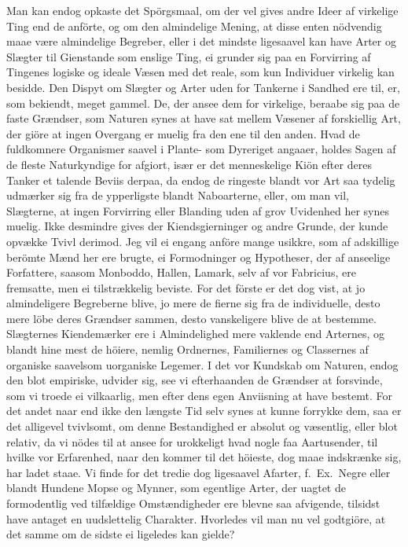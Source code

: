 \documentclass[12pt,a4paper]{article}
\newcommand{\opage}[1]{\marginnote{\footnotesize\textit{[#1]}}}
\begin{document}
Man kan endog opkaste det Spörgsmaal, om der vel gives andre Ideer af
virkelige Ting end de anförte, og om den almindelige Mening, at disse
enten nödvendig maae være almindelige Begreber, eller i det mindste
ligesaavel kan have Arter
\opage{236} og Slægter til Gienstande som enslige Ting, ei grunder sig paa en
Forvirring af Tingenes logiske og ideale Væsen med det reale, som kun
Individuer virkelig kan besidde. Den Dispyt om Slægter og Arter uden for
Tankerne i Sandhed ere til, er, som bekiendt, meget gammel. De, der ansee
dem for virkelige, beraabe sig paa de faste Grændser, som Naturen synes at
have sat mellem Væsener af forskiellig Art, der giöre at ingen Overgang er
muelig fra den ene til den anden. Hvad de fuldkomnere Organismer saavel i
Plante- som Dyreriget angaaer, holdes Sagen af de fleste Naturkyndige for
afgiort, især er det menneskelige Kiön efter deres Tanker et talende Beviis
derpaa, da endog de ringeste blandt vor Art saa tydelig udmærker sig fra de
ypperligste blandt Naboarterne, eller, om man vil, Slægterne, at ingen
Forvirring eller Blanding uden af grov Uvidenhed her synes muelig. Ikke
desmindre gives der Kiendsgierninger og andre Grunde, der kunde opvække
Tvivl derimod. Jeg vil ei engang anföre mange usikkre, som af adskillige
berömte Mænd her ere brugte, ei Formodninger og Hypotheser, der af
anseelige Forfattere, saasom Monboddo, Hallen, Lamark, selv af vor
Fabricius, ere fremsatte, men ei tilstrækkelig beviste. For det förste er
det dog vist, at jo almindeligere Begreberne blive, jo mere de fierne sig
fra de individuelle, desto mere löbe deres Grændser sammen, desto
vanskeligere blive de at bestemme. Slægternes Kiendemærker ere i
Almindelighed mere vaklende end Arternes, og blandt hine mest de höiere,
nemlig Ordnernes, Familiernes og Classernes af organiske saavelsom
uorganiske Legemer. I det vor Kundskab om Naturen, endog den blot
empiriske, udvider sig, see vi efterhaanden de Grændser at forsvinde,
\opage{237} som vi troede ei vilkaarlig, men efter dens egen Anviisning at have
bestemt. For det andet naar end ikke den længste Tid selv synes at kunne
forrykke dem, saa er det alligevel tvivlsomt, om denne Bestandighed er
absolut og væsentlig, eller blot relativ, da vi nödes til at ansee for
urokkeligt hvad nogle faa Aartusender, til hvilke vor Erfarenhed, naar den
kommer til det höieste, dog maae indskrænke sig, har ladet staae. Vi finde
for det tredie dog ligesaavel Afarter, f.~Ex.\ Negre eller blandt Hundene
Mopse og Mynner, som egentlige Arter, der uagtet de formodentlig ved
tilfældige Omstændigheder ere blevne saa afvigende, tilsidst have antaget
en uudslettelig Charakter. Hvorledes vil man nu vel godtgiöre, at det
samme om de sidste ei ligeledes kan gielde?
\end{document}
